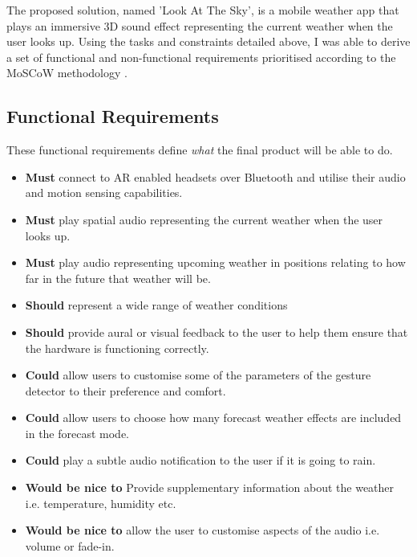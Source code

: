 \documentclass{l4proj}
\begin{document}
The proposed solution, named 'Look At The Sky', is a mobile weather app that plays an immersive 3D sound effect representing the current weather when the user looks up.
Using the tasks and constraints detailed above, I was able to derive a set of functional and non-functional requirements prioritised according to the MoSCoW methodology \citep{kravchenko_ranking_2022}.

\subsection{Functional Requirements}

These functional requirements define \emph{what} the final product will be able to do.
\begin{itemize}
    \item \textbf{Must} connect to AR enabled headsets over Bluetooth and utilise their audio and motion sensing capabilities.
    \item \textbf{Must} play spatial audio representing the current weather when the user looks up.
    \item \textbf{Must} play audio representing upcoming weather in positions relating to how far in the future that weather will be.
    \item \textbf{Should} represent a wide range of weather conditions
    \item \textbf{Should} provide aural or visual feedback to the user to help them ensure that the hardware is functioning correctly.
    \item \textbf{Could} allow users to customise some of the parameters of the gesture detector to their preference and comfort.
    \item \textbf{Could} allow users to choose how many forecast weather effects are included in the forecast mode.
    \item \textbf{Could} play a subtle audio notification to the user if it is going to rain.
    \item \textbf{Would be nice to} Provide supplementary information about the weather i.e. temperature, humidity etc.
    \item \textbf{Would be nice to} allow the user to customise aspects of the audio i.e. volume or fade-in.
    
\end{itemize}
\end{document}
